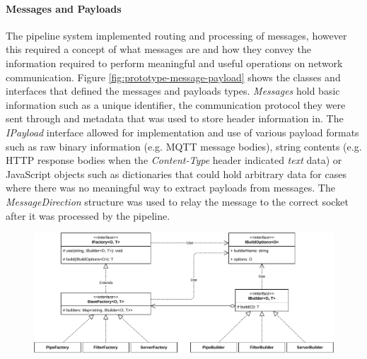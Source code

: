 \paragraph{Messages and Payloads}
The pipeline system implemented routing and processing of messages, however this required a concept of what messages are and how they convey the information required to perform meaningful and useful operations on network communication. Figure \ref{fig:prototype-message-payload} shows the classes and interfaces that defined the messages and payloads types. \emph{Messages} hold basic information such as a unique identifier, the communication protocol they were sent through and metadata that was used to store header information in. The \emph{IPayload} interface allowed for implementation and use of various payload formats such as raw binary information (e.g. \ac{MQTT} message bodies), string contents (e.g. \ac{HTTP} response bodies when the \emph{Content-Type} header indicated \emph{text} data) or JavaScript objects such as dictionaries that could hold arbitrary data for cases where there was no meaningful way to extract payloads from messages. The \emph{MessageDirection} structure was used to relay the message to the correct socket after it was processed by the pipeline.

\begin{figure}[h]
    \centering
    \includegraphics[width=14cm]{img/ch04/prototype/factory-builder.pdf}
    \label{fig:prototype-factory-builder}
\end{figure}

